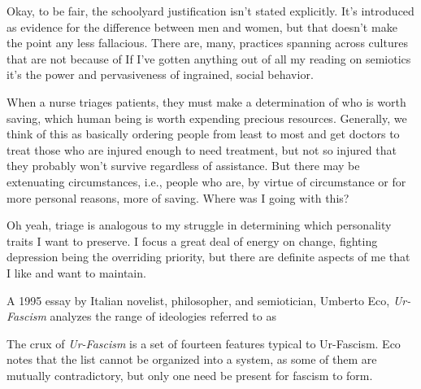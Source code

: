 \documentclass[../butidigress.tex]{subfiles}
\begin{document}
Okay, to be fair, the schoolyard justification isn't stated explicitly.
It's introduced as evidence for the  difference between men and women, but that doesn't make the point any less fallacious.
There are, many, practices spanning across cultures that are not because of 
If I've gotten anything out of all my reading on semiotics it's the power and pervasiveness of ingrained, social behavior.


When a nurse triages patients, they must make a determination of who is worth saving, which human being is worth expending precious resources.
Generally, we think of this as basically ordering people from least to most  and get doctors to treat those who are injured enough to need treatment, but not so injured that they probably won't survive regardless of assistance.
But there may be extenuating circumstances, i.e., people who are, by virtue of circumstance or for more personal reasons, more  of saving.
Where was I going with this?

Oh yeah, triage is analogous to my struggle in determining which personality traits I want to preserve.
I focus a great deal of energy on change, fighting depression being the overriding priority, but there are definite aspects of me that I like and want to maintain.

A 1995 essay by Italian novelist, philosopher, and semiotician, Umberto Eco, \textit{Ur-Fascism} analyzes the range of ideologies referred to as 

The crux of \textit{Ur-Fascism} is a set of fourteen features typical to Ur-Fascism.
Eco notes that the list cannot be organized into a system, as some of them are mutually contradictory, but only one need be present for fascism to form.\autocite[5--8]{urfascism}
\end{document}
